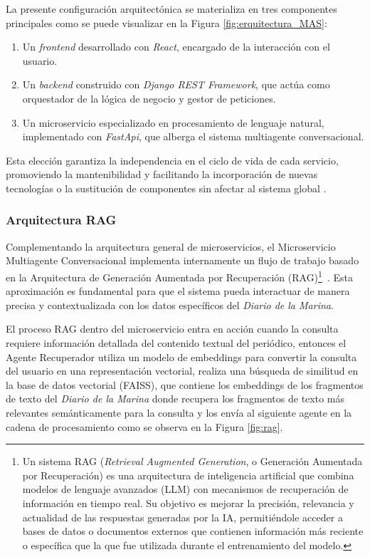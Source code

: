 La presente configuración arquitectónica se materializa en tres componentes principales como se puede visualizar en la Figura \ref{fig:erquitectura_MAS}:
  
\begin{enumerate}
	\item Un \textit{frontend} desarrollado con \textit{React}, encargado de la interacción con el usuario.  
	\item Un \textit{backend} construido con \textit{Django REST Framework}, que actúa como orquestador de la lógica de negocio y gestor de peticiones.  
	\item Un microservicio especializado en procesamiento de lenguaje natural, implementado con \textit{FastApi}, que alberga el sistema multiagente conversacional.  
\end{enumerate}

Esta elección garantiza la independencia en el ciclo de vida de cada servicio, promoviendo la mantenibilidad y facilitando la incorporación de nuevas tecnologías o la sustitución de componentes sin afectar al sistema global \cite{turn0search1,turn1search4}.

\subsubsection{Arquitectura RAG}

Complementando la arquitectura general de microservicios, el Microservicio Multiagente Conversacional implementa internamente un flujo de trabajo basado en la Arquitectura de Generación Aumentada por Recuperación (RAG)\footnote{Un sistema RAG (\textit{Retrieval Augmented Generation}, o Generación Aumentada por Recuperación) es una arquitectura de inteligencia artificial que combina modelos de lenguaje avanzados (LLM) con mecanismos de recuperación de información en tiempo real. Su objetivo es mejorar la precisión, relevancia y actualidad de las respuestas generadas por la IA, permitiéndole acceder a bases de datos o documentos externos que contienen información más reciente o específica que la que fue utilizada durante el entrenamiento del modelo.}~\cite{lewis2020retrievalaugmented}. Esta aproximación es fundamental para que el sistema pueda interactuar de manera precisa y contextualizada con los datos específicos del \textit{Diario de la Marina}.

El proceso RAG dentro del microservicio entra en acción cuando  la consulta requiere información detallada del contenido textual del periódico, entonces el Agente Recuperador utiliza un modelo de embeddings para convertir la consulta del usuario en una representación vectorial, realiza una búsqueda de similitud en la base de datos vectorial (FAISS), que contiene los embeddings de los fragmentos de texto del \textit{Diario de la Marina} donde recupera los fragmentos de texto más relevantes semánticamente para la consulta y los envía al siguiente agente en la cadena de procesamiento como se observa en la Figura \ref{fig:rag}.

